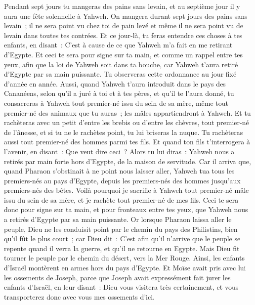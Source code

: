 \begin{multicols}{2}
Pendant sept jours tu mangeras des pains sans levain, et au septième jour il y aura une fête solennelle à Yahweh.
On mangera durant sept jours des pains sans levain~; il ne sera point vu chez toi de pain levé et même il ne sera point vu de levain dans toutes tes contrées.
Et ce jour-là, tu feras entendre ces choses à tes enfants, en disant~: C'est à cause de ce que Yahweh m'a fait en me retirant d'Egypte.
Et ceci te sera pour signe sur ta main, et comme un rappel entre tes yeux, afin que la loi de Yahweh soit dans ta bouche, car Yahweh t'aura retiré d'Egypte par sa main puissante.
Tu observeras cette ordonnance au jour fixé d'année en année.
Aussi, quand Yahweh t'aura introduit dans le pays des Cananéens, selon qu'il a juré à toi et à tes pères, et qu'il te l'aura donné,
tu consacreras à Yahweh tout premier-né issu du sein de sa mère, même tout premier-né des animaux que tu auras~; les mâles appartiendront à Yahweh.
Et tu rachèteras avec un petit d'entre les brebis ou d'entre les chèvres, tout premier-né de l'ânesse, et si tu ne le rachètes point, tu lui briseras la nuque. Tu rachèteras aussi tout premier-né des hommes parmi tes fils.
Et quand ton fils t'interrogera à l'avenir, en disant~: Que veut dire ceci~? Alors tu lui diras~: Yahweh nous a retirés par main forte hors d'Egypte, de la maison de servitude.
Car il arriva que, quand Pharaon s'obstinait à ne point nous laisser aller, Yahweh tua tous les premiers-nés au pays d'Egypte, depuis les premiers-nés des hommes jusqu'aux premiers-nés des bêtes. Voilà pourquoi je sacrifie à Yahweh tout premier-né mâle issu du sein de sa mère, et je rachète tout premier-né de mes fils.
Ceci te sera donc pour signe sur ta main, et pour fronteaux entre tes yeux, que Yahweh nous a retirés d'Egypte par sa main puissante.
Or lorsque Pharaon laissa aller le peuple, Dieu ne les conduisit point par le chemin du pays des Philistins, bien qu'il fût le plus court~; car Dieu dit~: C'est afin qu'il n'arrive que le peuple se repente quand il verra la guerre, et qu'il ne retourne en Egypte.
Mais Dieu fit tourner le peuple par le chemin du désert, vers la Mer Rouge. Ainsi, les enfants d'Israël montèrent en armes hors du pays d'Egypte.
Et Moïse avait pris avec lui les ossements de Joseph, parce que Joseph avait expressément fait jurer les enfants d'Israël, en leur disant~: Dieu vous visitera très certainement, et vous transporterez donc avec vous mes ossements d'ici.

\end{multicols}
